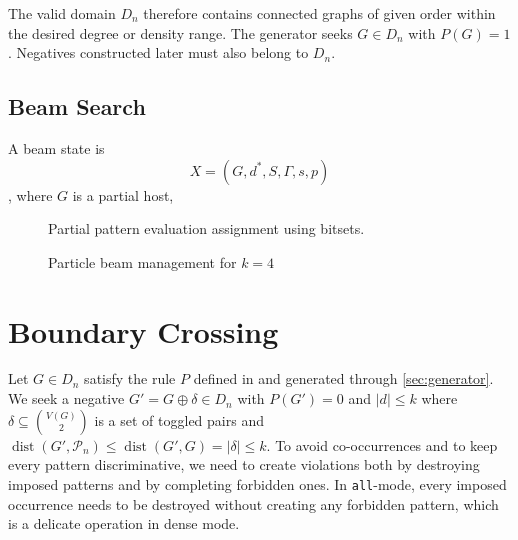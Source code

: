\documentclass[11pt,twocolumn]{article}
\newcommand{\toggle}[2]{#1\mathbin{\oplus}#2}
\begin{document}

The valid domain $D_n$ therefore contains connected graphs of given order within the desired degree or density range.
The generator seeks $G \in D_n$ with $P(G) = 1$.
Negatives constructed later must also belong to $D_n$.


\subsection{Beam Search} %

A beam state is $$X = (G, d^*, S, \Gamma, s, p)$$, where $G$ is a partial host, 


\begin{figure}
	\centering
	
	\caption{Partial pattern evaluation assignment using bitsets.}
	\label{fig:bitset}
\end{figure}

\begin{figure}
	\centering
	\resizebox{\textwidth}{!}{}  %
	\caption{Particle beam management for $k=4$}
	\label{fig:beam-states}
\end{figure}


\section{Boundary Crossing}\label{sec:crossing}

Let $G \in D_n$ satisfy the rule $P$ defined in and generated through \cref{sec:generator}.
We seek a negative $G'=\toggle{G}{\delta}\in D_n$ with $P(G')=0$ and $|d| \leq k$ where $\delta\subseteq\binom{V(G)}2$ is a set of toggled pairs and $\operatorname{dist}(G',\mathcal P_n)\le\operatorname{dist}(G',G)=|\delta|\le k.$
To avoid co-occurrences and to keep every pattern discriminative, we need to create violations both by destroying imposed patterns and by completing forbidden ones.
In \texttt{all}-mode, every imposed occurrence needs to be destroyed without creating any forbidden pattern, which is a delicate operation in dense mode.
\end{document}

